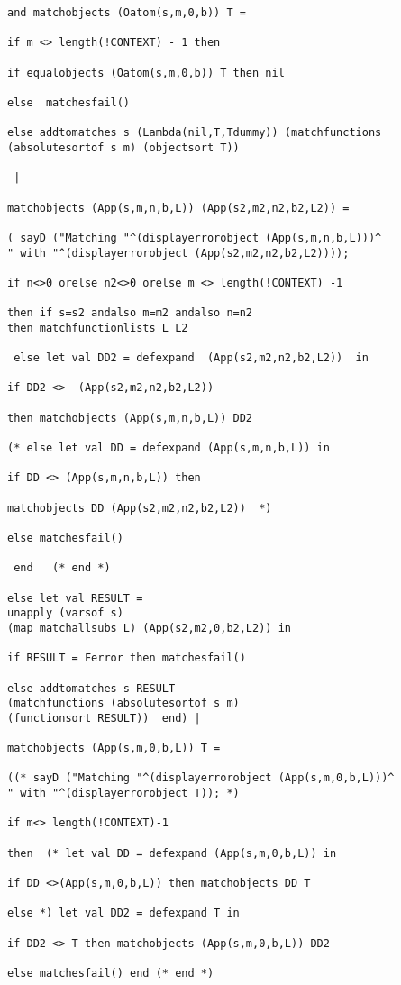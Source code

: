 \documentclass[12pt]{article}
\begin{document}
\begin{verbatim}
and matchobjects (Oatom(s,m,0,b)) T = 

if m <> length(!CONTEXT) - 1 then

if equalobjects (Oatom(s,m,0,b)) T then nil

else  matchesfail()

else addtomatches s (Lambda(nil,T,Tdummy)) (matchfunctions 
(absolutesortof s m) (objectsort T))

 |

matchobjects (App(s,m,n,b,L)) (App(s2,m2,n2,b2,L2)) =

( sayD ("Matching "^(displayerrorobject (App(s,m,n,b,L)))^
" with "^(displayerrorobject (App(s2,m2,n2,b2,L2)))); 

if n<>0 orelse n2<>0 orelse m <> length(!CONTEXT) -1 

then if s=s2 andalso m=m2 andalso n=n2 
then matchfunctionlists L L2

 else let val DD2 = defexpand  (App(s2,m2,n2,b2,L2))  in

if DD2 <>  (App(s2,m2,n2,b2,L2))  

then matchobjects (App(s,m,n,b,L)) DD2 

(* else let val DD = defexpand (App(s,m,n,b,L)) in

if DD <> (App(s,m,n,b,L)) then

matchobjects DD (App(s2,m2,n2,b2,L2))  *)

else matchesfail()

 end   (* end *)

else let val RESULT = 
unapply (varsof s) 
(map matchallsubs L) (App(s2,m2,0,b2,L2)) in

if RESULT = Ferror then matchesfail()

else addtomatches s RESULT 
(matchfunctions (absolutesortof s m) 
(functionsort RESULT))  end) |

matchobjects (App(s,m,0,b,L)) T =

((* sayD ("Matching "^(displayerrorobject (App(s,m,0,b,L)))^
" with "^(displayerrorobject T)); *)

if m<> length(!CONTEXT)-1

then  (* let val DD = defexpand (App(s,m,0,b,L)) in

if DD <>(App(s,m,0,b,L)) then matchobjects DD T

else *) let val DD2 = defexpand T in

if DD2 <> T then matchobjects (App(s,m,0,b,L)) DD2

else matchesfail() end (* end *)


\end{verbatim}
\end{document}
